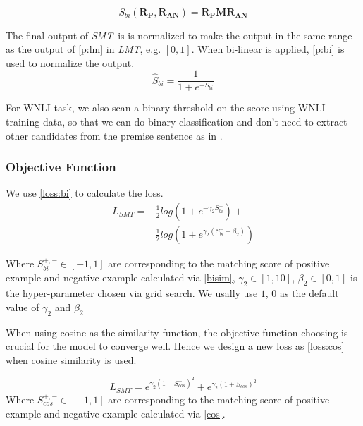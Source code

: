 \documentclass[11pt,a4paper]{article}
\newcommand{\lmt}{\textit{LMT}}
\newcommand{\smt}{\textit{SMT}}
\begin{document}
\begin{equation}
\label{bisim}
    S_{bi}\left(\mathbf{R_P}, \mathbf{R_{AN}}\right)=\mathbf{R_P} \mathbf{M} \mathbf{R^{\intercal}_{AN}}
\end{equation}



The final output of \smt~is is normalized to make the output in the same range as the output of \eqref{p:lm} in \lmt, e.g. $[0,1]$.
When bi-linear is applied, \eqref{p:bi} is used to normalize the output. \begin{equation}
\label{p:bi}
    \hat{S}_{bi} = \frac{1}{1+e^{-S_{bi}}}
\end{equation}



For WNLI task, we also scan a binary threshold on the score using WNLI training data, so that we can do binary  classification and don't need to extract other candidates from the premise sentence as in \cite{kocijan2019surprisingly}.

\subsubsection{Objective Function}
We use \eqref{loss:bi} to calculate the loss.
\begin{equation}
    \begin{split}
            L_{SMT} = &\frac{1}{2} log\left(1+e^{-\gamma_2 S^+_{bi}}\right) +\\
            &\frac{1}{2} log\left(1+e^{ \gamma_2 \left( S^-_{bi} + \beta_2 \right)}\right)
   \end{split}
    \label{loss:bi} 
\end{equation}

Where  $S^{+,-}_{bi} \in \left[ -1, 1\right]$ are corresponding to the matching score of positive example and negative example calculated via \eqref{bisim}, $\gamma_2 \in [1,10]$, $\beta_2 \in [0,1]$ is the hyper-parameter chosen via grid search. We usally use $1$, $0$ as the default value of  $\gamma_2$ and $\beta_2$

When using cosine as the similarity function, the objective function choosing is crucial for the model to converge well. Hence we design a new loss as \eqref{loss:cos} when cosine similarity is used.

\begin{equation}
    L_{SMT} = e^{\gamma_2 \left(1-S^{+}_{cos}\right)^2} + e^{\gamma_2 \left(1+S^{-}_{cos}\right)^2}
    \label{loss:cos}
\end{equation}
Where  $S^{+,-}_{cos} \in \left[ -1, 1\right]$ are corresponding to the matching score of positive example and negative example calculated via \eqref{cos}.
\end{document}
